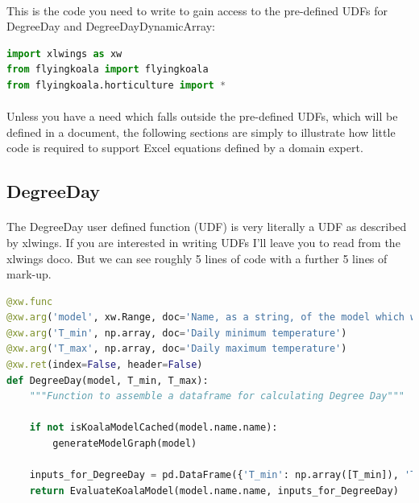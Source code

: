 \documentclass[12pt,a4paper,twoside,openright,titlepage]{article}
\begin{document}
\paragraph{} This is the code you need to write to gain access to the pre-defined UDFs for DegreeDay and DegreeDayDynamicArray:

\begin{lstlisting}[language=Python]
import xlwings as xw
from flyingkoala import flyingkoala
from flyingkoala.horticulture import *
\end{lstlisting}

\paragraph{} Unless you have a need which falls outside the pre-defined UDFs, which will be defined in a document, the following sections are simply to illustrate how little code is required to support Excel equations defined by a domain expert.

\subsection{DegreeDay}

\paragraph{} The DegreeDay user defined function (UDF) is very literally a UDF as described by xlwings. If you are interested in writing UDFs I'll leave you to read from the xlwings doco. But we can see roughly 5 lines of code with a further 5 lines of mark-up.

\begin{lstlisting}[language=Python]
@xw.func
@xw.arg('model', xw.Range, doc='Name, as a string, of the model which will be evaluated. The Excel cell name / named range')
@xw.arg('T_min', np.array, doc='Daily minimum temperature')
@xw.arg('T_max', np.array, doc='Daily maximum temperature')
@xw.ret(index=False, header=False)
def DegreeDay(model, T_min, T_max):
    """Function to assemble a dataframe for calculating Degree Day"""

    if not isKoalaModelCached(model.name.name):
        generateModelGraph(model)

    inputs_for_DegreeDay = pd.DataFrame({'T_min': np.array([T_min]), 'T_max': np.array([T_max])})
    return EvaluateKoalaModel(model.name.name, inputs_for_DegreeDay)
\end{lstlisting}
\end{document}
